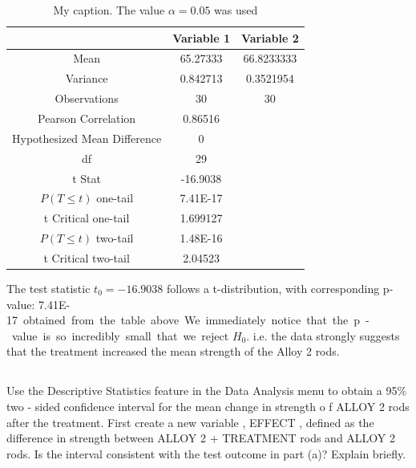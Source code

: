 \documentclass[letterpaper]{article}
\begin{document}
\begin{table}[H]
 \centering
 \begin{tabular}{c|c|c|}
                               & Variable 1 & Variable 2 \\ \hline
  Mean                         & 65.27333   & 66.8233333 \\ \hline
  Variance                     & 0.842713   & 0.3521954  \\ \hline
  Observations                 & 30         & 30         \\ \hline
  Pearson Correlation          & 0.86516    &            \\ \hline
  Hypothesized Mean Difference & 0          &            \\ \hline
  df                           & 29         &            \\ \hline
  t Stat                       & -16.9038   &            \\ \hline
  $P(T \leq t)$ one-tail       & 7.41E-17   &            \\ \hline
  t Critical one-tail          & 1.699127   &            \\ \hline
  $P(T \leq t)$ two-tail       & 1.48E-16   &            \\ \hline
  t Critical two-tail          & 2.04523    &            \\ \hline
 \end{tabular}
 \caption{My caption. The value $\alpha=0.05$ was used}
 \label{my-label}
\end{table}

The test statistic $t_0 = -16.9038$ follows a t-distribution, with
corresponding p-value: \SI{7.41E-17} obtained from the table above.

We immediately notice that the p-value is so incredibly small that we
reject $H_0$. i.e. the data strongly suggests that the treatment
increased the mean strength of the Alloy 2 rods.

\subsection{}%
Use the  Descriptive Statistics feature in  the  Data Analysis menu to obtain a
95\%  two - sided  confidence interval for the mean change in strength o f ALLOY
2 rods after the treatment.   First create a new variable , EFFECT , defined as
the difference in strength between ALLOY 2 + TREATMENT rods and ALLOY 2 rods. Is
the interval consistent with the  test  outcome in part  (a)? Explain briefly.
\end{document}
